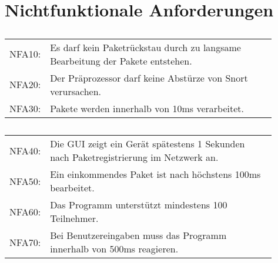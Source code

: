 \chapter{Nichtfunktionale Anforderungen}

\section{\sppname}
\begin{tabular}{lp{0.9\linewidth}}
NFA10: & Es darf kein Paketrückstau durch zu langsame Bearbeitung der Pakete entstehen. \\

NFA20: & Der Präprozessor darf keine Abstürze von Snort verursachen. \\

NFA30: & Pakete werden innerhalb von 10ms verarbeitet.
\end{tabular}
\section{\programname}
\begin{tabular}{lp{0.9\linewidth}}
NFA40: & Die GUI zeigt ein Gerät spätestens 1 Sekunden nach Paketregistrierung im Netzwerk an. \\

NFA50: & Ein einkommendes Paket ist nach höchstens 100ms bearbeitet. \\

NFA60: & Das Programm unterstützt mindestens 100 Teilnehmer. \\

NFA70: & Bei Benutzereingaben muss das Programm innerhalb von 500ms reagieren. \\
\end{tabular} 